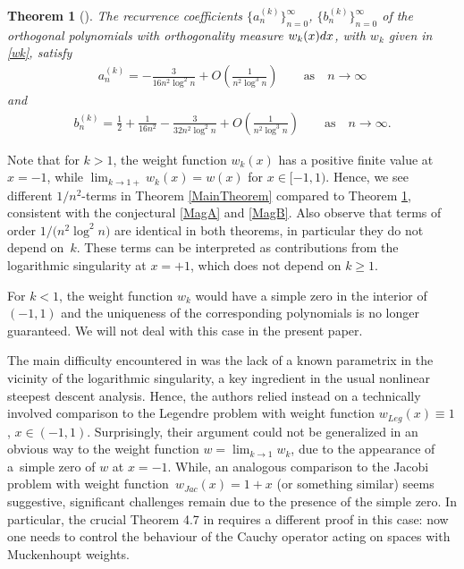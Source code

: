 \documentclass[11pt]{article}
\numberwithin{equation}{section}
\newtheorem{Theorem}{Theorem}[section]
\numberwithin{equation}{section}
\begin{document}
\begin{Theorem}[{\cite{CD}}]\label{CDTheorem}
 The recurrence coefficients $\big\lbrace a_n^{(k)}\big\rbrace_{n=0}^\infty$, $\big\lbrace b_n^{(k)} \big\rbrace_{n=0}^\infty$ of the orthogonal polynomials with orthogonality measure $w_k(x){\rm d}x$, with $w_k$ given in \eqref{wk}, satisfy
\begin{align*}
 a_n^{(k)} = -\frac{3}{16n^2\log^2 n} + O\left( \frac{1}{n^2\log^3 n}\right) \qquad \text{as} \quad n \to \infty
\end{align*}
and
\begin{align*}
 b_n^{(k)} = \frac{1}{2}+\frac{1}{16n^2}-\frac{3}{32n^2\log^2 n} + O\left(\frac{1}{n^2\log^3 n}\right) \qquad \text{as} \quad n \to \infty.
\end{align*}
\end{Theorem}
Note that for $k > 1$, the weight function $w_k(x)$ has a positive finite value at $x = -1$, while $\lim_{k\to 1+} w_k(x) = w(x)$ for $x \in [-1,1)$. Hence, we see different $1/n^2$-terms in Theorem \ref{MainTheorem} compared to Theorem \ref{CDTheorem}, consistent with the conjectural \eqref{MagA} and \eqref{MagB}. Also observe that terms of order $1/\big(n^2 \log^2 n\big)$ are identical in both theorems, in particular they do not depend on~$k$. These terms can be interpreted as contributions from the logarithmic singularity at $x = +1$, which does not depend on $k \geq 1$.

For $k < 1$, the weight function $w_k$ would have a simple zero in the interior of $(-1,1)$ and the uniqueness of the corresponding polynomials is no longer guaranteed. We will not deal with this case in the present paper.

The main difficulty encountered in \cite{CD} was the lack of a known parametrix in the vicinity of the logarithmic singularity, a key ingredient in the usual nonlinear steepest descent analysis. Hence, the authors relied instead on a technically involved comparison to the Legendre problem with weight function $w_{Leg}(x) \equiv 1$, $x \in (-1,1)$. Surprisingly, their argument could not be generalized in an obvious way to the weight function $w = \lim_{k\to 1} w_k$, due to the appearance of a~simple zero of $w$ at $x = -1$. While, an analogous comparison to the Jacobi problem with weight function~$w_{Jac}(x) = 1+x$ (or something similar) seems suggestive, significant challenges remain due to the presence of the simple zero. In particular, the crucial Theorem 4.7 in \cite{CD} requires a different proof in this case: now one needs to control the behaviour of the Cauchy operator acting on spaces with Muckenhoupt weights.
\end{document}
